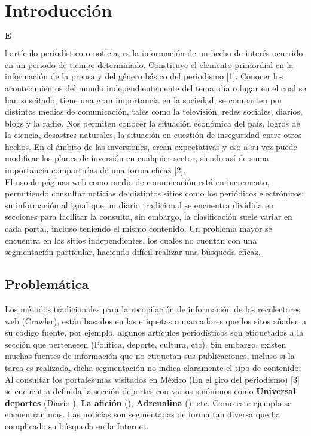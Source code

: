 
\chapter{Introducción}


\begin{Large}$\mathbf{E}$\end{Large}l artículo periodístico o noticia, es la información de un hecho de interés ocurrido en un periodo de tiempo determinado. Constituye el elemento primordial en la información de la prensa y del género básico del periodismo [1]. Conocer los acontecimientos del mundo independientemente del tema, día o lugar en el cual se han suscitado, tiene una gran importancia en la sociedad, se comparten por distintos medios de comunicación, tales como la televisión, redes sociales, diarios, blogs y la radio. Nos permiten conocer la situación económica del país, logros de la ciencia, desastres naturales, la situación en cuestión de inseguridad entre otros hechos. En el ámbito de las inversiones, crean expectativas y eso a su vez puede modificar los planes de inversión en cualquier sector, siendo así de suma importancia compartirlas de una forma eficaz [2].\\

El uso de páginas web como medio de comunicación está en incremento, permitiendo consultar noticias de distintos sitios como los periódicos electrónicos; su información al igual que un diario tradicional se encuentra dividida en secciones para facilitar la consulta, sin embargo, la clasificación suele variar en cada portal, incluso teniendo el mismo contenido. Un problema mayor se encuentra en los sitios independientes, los cuales no cuentan con una segmentación particular, haciendo difícil realizar una búsqueda eficaz.\\



\section{Problemática}


Los métodos tradicionales para la recopilación de información de los recolectores web (Crawler), están basados en las etiquetas o marcadores que los sitos añaden a su código fuente, por ejemplo, algunos artículos periodísticos son etiquetados a la sección que pertenecen (Política, deporte, cultura, etc). Sin embargo, existen muchas fuentes de información que no etiquetan sus publicaciones, incluso si la tarea es realizada, dicha segmentación no indica claramente el tipo de contenido; Al consultar los portales mas visitados en México (En el giro del periodismo) [3] se encuentra definida la sección deportes con varios sinónimos como \textbf{Universal deportes} (Diario ), \textbf{La afición} (), \textbf{Adrenalina} (), etc. Como este ejemplo se encuentran mas. Las noticias son segmentadas de forma tan diversa que ha complicado su búsqueda en la Internet.\\


